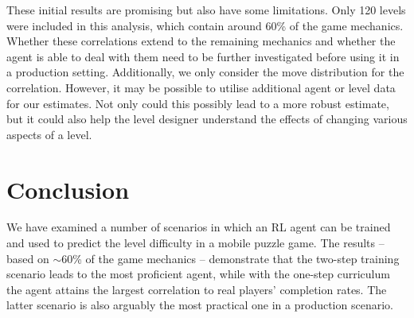\documentclass[conference]{IEEEtran}
\begin{document}
These initial results are promising but also have some limitations.
Only 120 levels were included in this analysis, which contain around 60\% of the game mechanics.
Whether these correlations extend to the remaining mechanics and whether the agent is able to deal with them need to be further investigated before using it in a production setting.
Additionally, we only consider the move distribution for the correlation.
However, it may be possible to utilise additional agent or level data for our estimates.
Not only could this possibly lead to a more robust estimate, but it could also help the level designer understand the effects of changing various aspects of a level.


\section{Conclusion}

We have examined a number of scenarios in which an RL agent can be trained and used to predict the level difficulty in a mobile puzzle game. 
The results -- based on $\sim$60\% of the game mechanics -- demonstrate that the two-step training scenario leads to the most proficient agent, while with the one-step curriculum the agent attains the largest correlation to real players' completion rates. The latter scenario is also arguably the most practical one in a production scenario.
\end{document}
